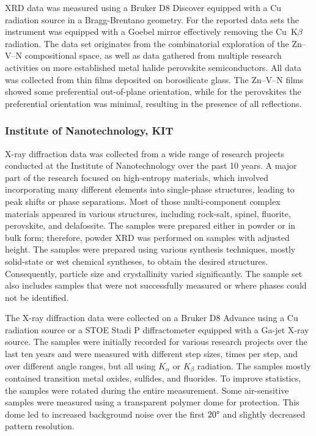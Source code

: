 XRD data was measured using a Bruker D8 Discover equipped with a Cu radiation source in a Bragg-Brentano geometry. For the reported data sets the instrument was equipped with a Goebel mirror effectively removing the Cu~K$\beta$ radiation. The data set originates from the combinatorial exploration of the Zn–V–N compositional space, as well as data gathered from multiple research activities on more established metal halide perovskite semiconductors. All data was collected from thin films deposited on borosilicate glass. The Zn–V–N films showed some preferential out-of-plane orientation, while for the perovskites the preferential orientation was minimal, resulting in the presence of all reflections.

\subsubsection*{Institute of Nanotechnology, KIT}

X-ray diffraction data was collected from a wide range of research projects conducted at the Institute of Nanotechnology over the past 10 years. A major part of the research focused on high-entropy materials, which involved incorporating many different elements into single-phase structures, leading to peak shifts or phase separations. Most of those multi-component complex materials appeared in various structures, including rock-salt, spinel, fluorite, perovskite, and delafossite. The samples were prepared either in powder or in bulk form; therefore, powder XRD was performed on samples with adjusted height. The samples were prepared using various synthesis techniques, mostly solid-state or wet chemical syntheses, to obtain the desired structures. Consequently, particle size and crystallinity varied significantly. The sample set also includes samples that were not successfully measured or where phases could not be identified.

The X-ray diffraction data were collected on a Bruker D8 Advance using a Cu radiation source or a STOE Stadi P diffractometer equipped with a Ga-jet X-ray source. The samples were initially recorded for various research projects over the last ten years and were measured with different step sizes, times per step, and over different angle ranges, but all using  $K_\alpha$ or  $K_\beta$ radiation. The samples mostly contained transition metal oxides, sulfides, and fluorides. To improve statistics, the samples were rotated during the entire measurement. Some air-sensitive samples were measured using a transparent polymer dome for protection. This dome led to increased background noise over the first $20\degree$ and slightly decreased pattern resolution.

